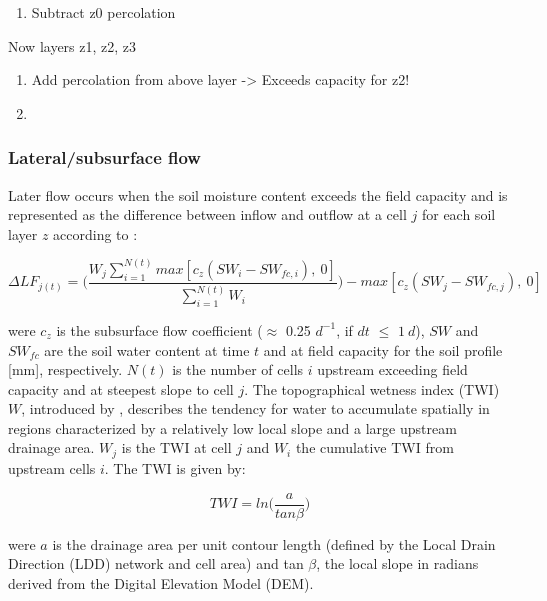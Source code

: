 \documentclass[]{article}
\providecommand{\tightlist}{%
  \setlength{\itemsep}{0pt}\setlength{\parskip}{0pt}}
\begin{document}
\begin{enumerate}
\def\labelenumi{\arabic{enumi}.}
\setcounter{enumi}{1}
\tightlist
\item
  Subtract z0 percolation
\end{enumerate}

Now layers z1, z2, z3

\begin{enumerate}
\def\labelenumi{\arabic{enumi}.}
\item
  Add percolation from above layer -\textgreater{} Exceeds capacity for
  z2!
\item
\end{enumerate}

\subsubsection{Lateral/subsurface flow}\label{lateralsubsurface-flow}

Later flow occurs when the soil moisture content exceeds the field
capacity and is represented as the difference between inflow and outflow
at a cell \(j\) for each soil layer \(z\) according to
\cite{Manfreda2005}:

\begin{equation}
\Delta LF_{j(t)} = \Big( \frac{W_{j} \sum^{N(t)}_{i=1}max[c_{z}(SW_{i}-SW_{fc,i}),~0] }{ \sum^{N(t)}_{i=1} W_{i} } \Big) - max[c_z(SW_j-SW_{fc,j}),~0]
\label{eq:LF}  
\end{equation}

were \(c_z\) is the subsurface flow coefficient (\(\approx\) 0.25
\(d^{-1}\), if \(dt\) \(\leq\) \(1~d\)), \(SW\) and \(SW_{fc}\) are the
soil water content at time \(t\) and at field capacity for the soil
profile {[}mm{]}, respectively. \(N(t)\) is the number of cells \(i\)
upstream exceeding field capacity and at steepest slope to cell \(j\).
The topographical wetness index (TWI) \(W\), introduced by , describes
the tendency for water to accumulate spatially in regions characterized
by a relatively low local slope and a large upstream drainage area.
\(W_j\) is the TWI at cell \(j\) and \(W_i\) the cumulative TWI from
upstream cells \(i\). The TWI is given by:

\begin{equation}
TWI =ln\Big(\frac{a}{tan \beta} \Big)
\label{eq:Wz}  
\end{equation}

were \(a\) is the drainage area per unit contour length (defined by the
Local Drain Direction (LDD) network and cell area) and tan \(\beta\),
the local slope in radians derived from the Digital Elevation Model
(DEM).
\end{document}
